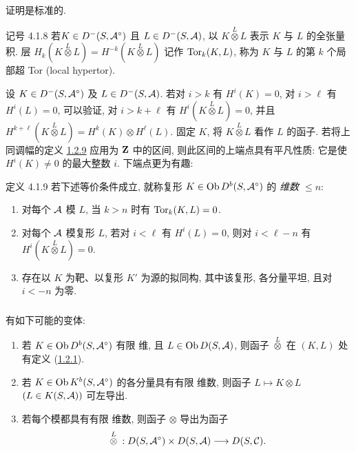 证明是标准的.

\begin{enonce*}{记号 4.1.8}
若\pageoriginale $K\in D^{-}(S,{\mathcal A}^{\circ})$ 且 $L\in D^{-}(S,{\mathcal A})$, 以 $K\overset{L}{\otimes}L$ 表示 $K$ 与 $L$ 的全张量积. 层 $H_{k}(K\overset{L}{\otimes}L)=H^{-k}(K\overset{L}{\otimes}L)$ 记作 $\operatorname{Tor}_k(K,L)$, 称为 $K$ 与 $L$ 的第 $k$ 个局部超 Tor (local hypertor).
\end{enonce*}

设 $K\in D^{-}(S,{\mathcal A}^{\circ})$ 及 $L\in D^{-}(S,{\mathcal A})$. 若对 $i>k$ 有 $H^{i}(K)=0$, 对 $i>\ell$ 有 $H^{i}(L)=0$, 可以验证, 对 $i>k+\ell$ 有 $H^{i}(K\overset{L}{\otimes}L)=0$, 并且 $H^{k+\ell}(K\overset{L}{\otimes}L)=H^{k}(K)\otimes H^{\ell}(L)$. 固定 $K$, 将 $K\overset{L}{\otimes}L$ 看作 $L$ 的函子. 若将上同调幅的定义 \hyperref[XVII.def1.2.9]{1.2.9} 应用为 $\mathbf{Z}$ 中的区间, 则此区间的上端点具有平凡性质: 它是使 $H^{i}(K)\neq0$ 的最大整数 $i$. 下端点更为有趣:

\begin{enonce*}{定义 4.1.9}
若下述等价条件成立, 就称复形 $K\in\operatorname{Ob} D^{b}(S,{\mathcal A}^{\circ})$ 的 \emph{\tTor 维数 $\leq n$}:
\begin{enumerate}
\renewcommand{\theenumi}{\roman{enumi}}
\renewcommand{\labelenumi}{(\theenumi)}
\item 对每个 ${\mathcal A}$ 模 $L$, 当 $k>n$ 时有 $\operatorname{Tor}_k(K,L)=0$.

\item 对每个 ${\mathcal A}$ 模复形 $L$, 若对 $i<\ell$ 有 $H^i(L)=0$, 则对 $i<\ell-n$ 有 $H^i(K\overset{L}{\otimes}L)=0$.

\item 存在以 $K$ 为靶、以复形 $K'$ 为源的拟同构, 其中该复形, 各分量平坦, 且对 $i<-n$ 为零.
\end{enumerate}
\end{enonce*}

\setcounter{subsubsection}{9}
\subsubsection{}
有如下可能的变体:
\begin{enumerate}
\renewcommand{\theenumi}{\roman{enumi}}
\renewcommand{\labelenumi}{(\theenumi)}
\item 若 $K\in\operatorname{Ob} D^{b}(S,{\mathcal A}^{\circ})$ 有限 \ttor 维, 且 $L\in\operatorname{Ob} D(S,{\mathcal A})$, 则函子 $\overset{L}{\otimes}$ 在 $(K,L)$ 处有定义 (\hyperref[XVII.def1.2.1]{1.2.1}).

\item 若 $K\in\operatorname{Ob} K^{b}(S,{\mathcal A}^{\circ})$ 的各分量具有有限 \tTor 维数, 则函子 $L\mapsto K\otimes L$ $(L\in K(S,{\mathcal A}))$ 可左导出.

\item 若每个模都具有有限 \tTor 维数, 则函子 $\otimes$ 导出为函子
\[
{}\overset{L}{\otimes}{}:D(S,{\mathcal A}^{\circ})\times
D(S,{\mathcal A})\longrightarrow D(S,{\mathcal C}){}.
\]
\end{enumerate}

